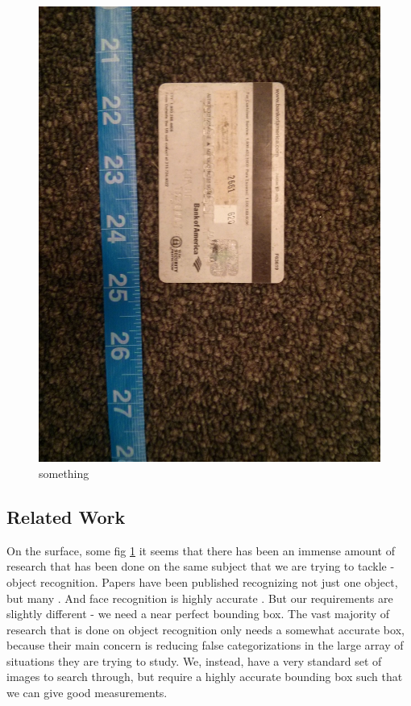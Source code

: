 \documentclass[10pt,twocolumn,letterpaper]{article}
\begin{document}
\begin{figure}[t]
\begin{center}
   \includegraphics[width=0.8\linewidth]{one}
\end{center}
   \caption{something}
\label{fig:first}
\end{figure}


\subsection{Related Work}

On the surface, some fig \ref{fig:first} it seems that there has been an immense amount of research that has been done on the same subject that we are trying to tackle - object recognition. Papers have been published recognizing not just one object, but many \cite{ObjectDetection}. And face recognition is highly accurate \cite{FaceDetection}. But our requirements are slightly different - we need a near perfect bounding box. The vast majority of research that is done on object recognition only needs a somewhat accurate box, because their main concern is reducing false categorizations in the large array of situations they are trying to study. We, instead, have a very standard set of images to search through, but require a highly accurate bounding box such that we can give good measurements.
\end{document}
